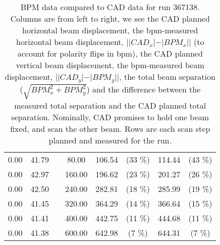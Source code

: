 \begin{table}
\begin{tabular}{c c c c c c c c}
0.00 & 41.79 &  & 80.00 & 106.54 &  (33 \%) & 114.44 &  (43 \%)\\
0.00 & 42.97 &  & 160.00 & 196.62 &  (23 \%) & 201.27 &  (26 \%)\\
0.00 & 42.50 &  & 240.00 & 282.81 &  (18 \%) & 285.99 &  (19 \%)\\
0.00 & 41.45 &  & 320.00 & 364.29 &  (14 \%) & 366.64 &  (15 \%)\\
0.00 & 41.41 &  & 400.00 & 442.75 &  (11 \%) & 444.68 &  (11 \%)\\
0.00 & 41.38 &  & 600.00 & 642.98 &  (7 \%) & 644.31 &  (7 \%)\\
\bottomrule
\end{tabular}
\caption{ 
  BPM data compared to CAD data for run 367138. Columns are from left to right, we see the CAD planned horizontal beam displacement, the bpm-measured horizontal beam displacement, $||CAD_{x}| - |BPM_{x}||$ (to account for polarity flips in bpm), the CAD planned vertical beam displacement, the bpm-measured beam displacement, $||CAD_{y}| - |BPM_{y}||$, the total beam separation ($\sqrt{BPM_{x}^2+BPM_{y}^2}$) and the difference between the measured total separation and the CAD planned total separation. Nominally, CAD promises to hold one beam fixed, and scan the other beam. Rows are each scan step planned and measured for the run. 
}
\end{table}

